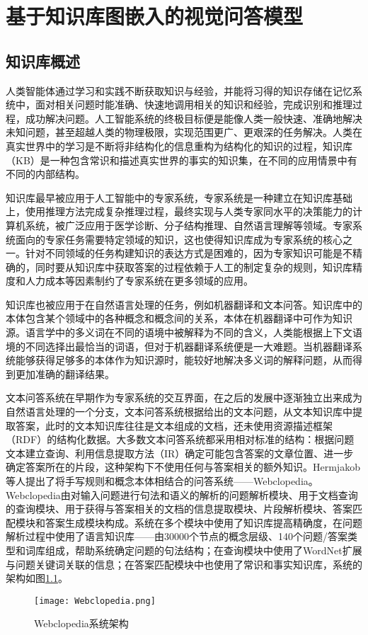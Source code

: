 \chapter{基于知识库图嵌入的视觉问答模型}
\section{知识库概述}
人类智能体通过学习和实践不断获取知识与经验，并能将习得的知识存储在记忆系统中，面对相关问题时能准确、快速地调用相关的知识和经验，完成识别和推理过程，成功解决问题。人工智能系统的终极目标便是能像人类一般快速、准确地解决未知问题，甚至超越人类的物理极限，实现范围更广、更艰深的任务解决。人类在真实世界中的学习是不断将非结构化的信息重构为结构化的知识的过程，知识库（KB）是一种包含常识和描述真实世界的事实的知识集，在不同的应用情景中有不同的内部结构。

知识库最早被应用于人工智能中的专家系统，专家系统是一种建立在知识库基础上，使用推理方法完成复杂推理过程，最终实现与人类专家同水平的决策能力的计算机系统，被广泛应用于医学诊断、分子结构推理、自然语言理解等领域。专家系统面向的专家任务需要特定领域的知识，这也使得知识库成为专家系统的核心之一。针对不同领域的任务构建知识的表达方式是困难的，因为专家知识可能是不精确的，同时要从知识库中获取答案的过程依赖于人工的制定复杂的规则，知识库精度和人力成本等因素制约了专家系统在更多领域的应用。

知识库也被应用于在自然语言处理的任务，例如机器翻译和文本问答。知识库中的本体包含某个领域中的各种概念和概念间的关系，本体在机器翻译中可作为知识源。语言学中的多义词在不同的语境中被解释为不同的含义，人类能根据上下文语境的不同选择出最恰当的词语，但对于机器翻译系统便是一大难题。当机器翻译系统能够获得足够多的本体作为知识源时，能较好地解决多义词的解释问题，从而得到更加准确的翻译结果。

文本问答系统在早期作为专家系统的交互界面，在之后的发展中逐渐独立出来成为自然语言处理的一个分支，文本问答系统根据给出的文本问题，从文本知识库中提取答案，此时的文本知识库往往是文本组成的文档，还未使用资源描述框架（RDF）的结构化数据。大多数文本问答系统都采用相对标准的结构：根据问题文本建立查询、利用信息提取方法（IR）确定可能包含答案的文章位置、进一步确定答案所在的片段，这种架构下不使用任何与答案相关的额外知识。Hermjakob等人提出了将手写规则和概念本体相结合的问答系统——Webclopedia。Webclopedia由对输入问题进行句法和语义的解析的问题解析模块、用于文档查询的查询模块、用于获得与答案相关的文档的信息提取模块、片段解析模块、答案匹配模块和答案生成模块构成。系统在多个模块中使用了知识库提高精确度，在问题解析过程中使用了语言知识库——由30000个节点的概念层级、140个问题/答案类型和词库组成，帮助系统确定问题的句法结构；在查询模块中使用了WordNet扩展与问题关键词关联的信息；在答案匹配模块中也使用了常识和事实知识库，系统的架构如图\ref{Webclopedia}。
\begin{figure}[H]
	\centering
	\texttt{[image: Webclopedia.png]}
	\caption{Webclopedia系统架构}
	\label{Webclopedia}
\end{figure}

